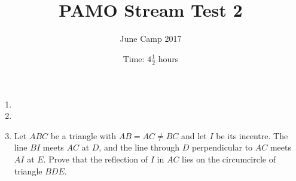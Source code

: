 \documentclass{article}
\title{PAMO Stream Test 2}
\author{June Camp 2017}
\date{Time: $4\frac{1}{2}$ hours}
\begin{document}
 \maketitle

\begin{enumerate}

\item %
	

\item %
	

\item %
	Let $ABC$ be a triangle with $AB = AC \neq BC$ and let $I$ be its incentre. The line $BI$ meets $AC$ at $D$, and the line through $D$ perpendicular to $AC$ meets $AI$ at $E$. Prove that the reflection of $I$ in $AC$ lies on the circumcircle of triangle $BDE$.

\end{enumerate}
\end{document}
